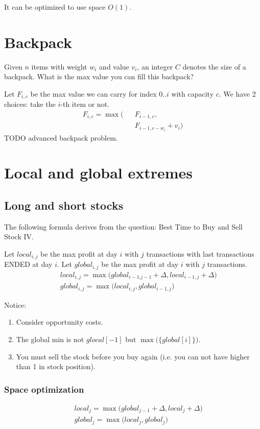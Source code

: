 {It can be optimized to use space $O(1)$. 


\section{Backpack}
Given $n$ items with weight $w_i$ and value $v_i$, an integer $C$ denotes the size of a backpack. What is the max value you can fill this backpack?

Let $F_{i, c}$ be the max value we can carry for index $0..i$ with capacity $c$. We have 2 choices: take the $i$-th item or not.
\begin{eqnarray*}
F_{i, c}= \max\big(&&F_{i-1, c}, \\
&&F_{i-1, c-w_i}+v_i\big)
\end{eqnarray*}
TODO advanced backpack problem. 

\section{Local and global extremes}
\subsection{Long and short stocks}
The following formula derives from the question: Best Time to Buy and Sell Stock IV. 

Let $local_{i, j}$ be the max profit at day $i$ with $j$ transactions with last transactions ENDED at day $i$. Let $global_{i, j}$ be the max profit at day $i$ with $j$ transactions.  
\begin{eqnarray*}
&& local_{i,j} = \max\Big(global_{i-1.j-1}+\Delta, local_{i-1,j}+\Delta\Big) \nonumber \\
&& global_{i,j} = \max\Big(local_{i, j}, global_{i-1,j}\Big)
\end{eqnarray*}

Notice:
\begin{enumerate}
\item Consider opportunity costs.
\item The global min is not $glocal[-1]$ but $\max\big(\{global[i]\}\big)$.
\item You must sell the stock before you buy again (i.e. you can not have higher than 1 in stock position). 
\end{enumerate}

\subsubsection{Space optimization}
\begin{eqnarray*}
&& local_{j} = \max\Big(global_{j-1} + \Delta, local_{j}+\Delta\Big)
\nonumber \\
&& global_{j} = \max\Big(local_{j}, global_{j}\Big)
\end{eqnarray*}

}

